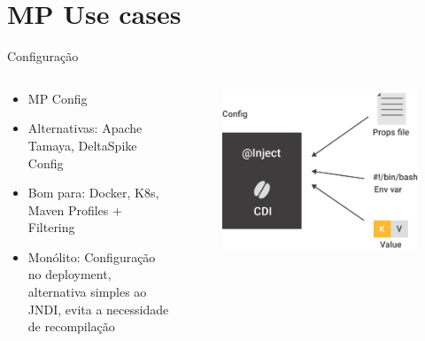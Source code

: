 \documentclass[aspectratio=169]{beamer}
\begin{document}
\section{MP Use cases}

\begin{frame}{Configuração}

\begin{columns}
    \begin{column}{0.7\textwidth}
    	\begin{itemize}
            \item MP Config
            \item Alternativas: Apache Tamaya, DeltaSpike Config
            \item Bom para: Docker, K8s, Maven Profiles + Filtering
            \item Monólito: Configuração no deployment, alternativa simples ao JNDI, evita a necessidade de recompilação
        \end{itemize}
	\end{column}
	\begin{column}{0.4\textwidth}  %
        \begin{figure}
        	\centering
        	\includegraphics[width=\linewidth]{Images/config}
        \end{figure}

	\end{column}
\end{columns}


\end{frame}
\end{document}
